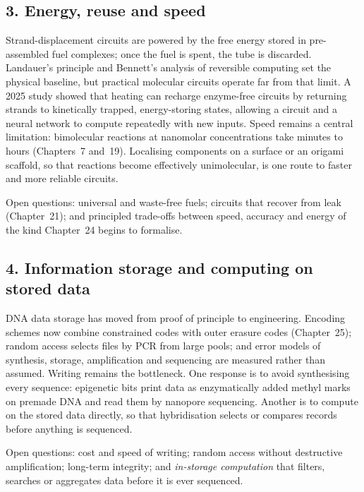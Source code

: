 \subsection*{3. Energy, reuse and speed}
Strand-displacement circuits are powered by the free energy stored in
pre-assembled fuel complexes; once the fuel is spent, the tube is discarded.
Landauer's principle and Bennett's analysis of reversible computing set the
physical baseline,\cite{Landauer1961,Bennett1982} but practical molecular
circuits operate far from that limit. A 2025 study showed that heating can
recharge enzyme-free circuits by returning strands to kinetically trapped,
energy-storing states, allowing a circuit and a neural network to compute
repeatedly with new inputs.\cite{SongQian2025} Speed remains a central
limitation: bimolecular reactions at nanomolar concentrations take minutes to
hours (Chapters~7 and~19). Localising components on a surface or an origami
scaffold, so that reactions become effectively unimolecular, is one route to
faster and more reliable circuits.

Open questions: universal and waste-free fuels; circuits that recover from
leak (Chapter~21);\cite{Wang2018} and principled trade-offs between speed,
accuracy and energy of the kind Chapter~24 begins to formalise.

\subsection*{4. Information storage and computing on stored data}
DNA data storage has moved from proof of principle to engineering. Encoding
schemes now combine constrained codes with outer erasure codes
(Chapter~25);\cite{Goldman2013,ErlichZielinski2017} random access selects files
by PCR from large pools;\cite{Organick2018} and error models of synthesis,
storage, amplification and sequencing are measured rather than
assumed.\cite{Chen2020bias,Gimpel2023} Writing remains the bottleneck. One
response is to avoid synthesising every sequence: epigenetic bits print data
as enzymatically added methyl marks on premade DNA and read them by nanopore
sequencing.\cite{ZhangC2024} Another is to compute on the stored data
directly, so that hybridisation selects or compares records before anything is
sequenced.

Open questions: cost and speed of writing; random access without destructive
amplification; long-term integrity; and \emph{in-storage computation} that
filters, searches or aggregates data before it is ever sequenced.

